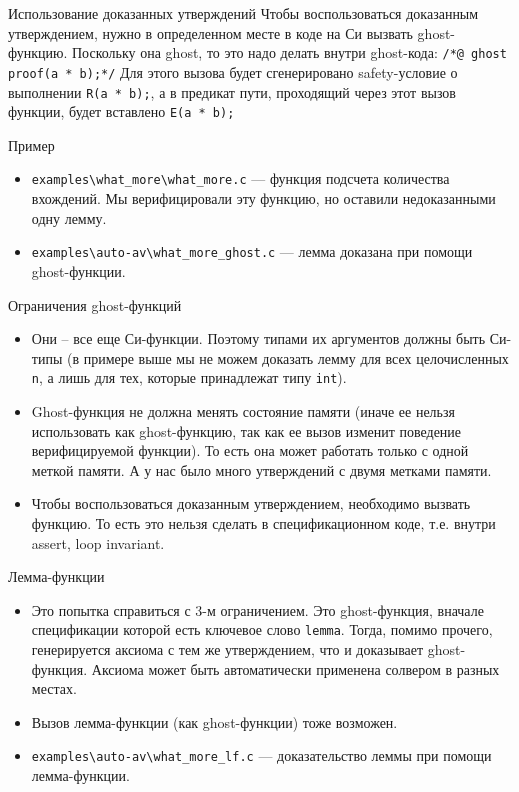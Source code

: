 \documentclass[hyperref={unicode=true}]{beamer}
\begin{document}
    \begin{frame}{Использование доказанных утверждений}
    Чтобы воспользоваться доказанным утверждением, нужно в определенном месте в коде на Си вызвать
    ghost-функцию. Поскольку она ghost, то это надо делать внутри ghost-кода:
    \texttt{/*@ ghost proof(a * b);*/} Для этого вызова будет сгенерировано safety-условие о выполнении
    \texttt{R(a * b);}, а в предикат пути, проходящий через этот вызов функции, будет вставлено
    \texttt{E(a * b);}
    \end{frame}

    \begin{frame}{Пример}
    \begin{itemize}
    \item \texttt{examples\textbackslash what\_more\textbackslash what\_more.c} --- функция подсчета
    количества вхождений. Мы верифицировали эту функцию, но оставили недоказанными одну лемму.
    \item \texttt{examples\textbackslash auto-av\textbackslash what\_more\_ghost.c} --- лемма доказана
    при помощи ghost-функции.
    \end{itemize}
    \end{frame}

    \begin{frame}{Ограничения ghost-функций}
    \begin{itemize}
    \item Они -- все еще Си-функции. Поэтому типами их аргументов должны быть Си-типы (в примере выше
            мы не можем доказать лемму для всех целочисленных \texttt{n}, а лишь для тех, которые
            принадлежат типу \texttt{int}).
    \item Ghost-функция не должна менять состояние памяти (иначе ее нельзя использовать как ghost-функцию,
            так как ее вызов изменит поведение верифицируемой функции). То есть она может работать только
    с одной меткой памяти. А у нас было много утверждений с двумя метками памяти.
    \item Чтобы воспользоваться доказанным утверждением, необходимо вызвать функцию. То есть это нельзя
    сделать в спецификационном коде, т.е. внутри assert, loop invariant.
    \end{itemize}
    \end{frame}

    \begin{frame}{Лемма-функции}
    \begin{itemize}
    \item Это попытка справиться с 3-м ограничением. Это ghost-функция, вначале спецификации которой есть
    ключевое слово \texttt{lemma}. Тогда, помимо прочего, генерируется аксиома с тем же утверждением, что и
    доказывает ghost-функция. Аксиома может быть автоматически применена солвером в разных местах.
    \item Вызов лемма-функции (как ghost-функции) тоже возможен.
    \item \texttt{examples\textbackslash auto-av\textbackslash what\_more\_lf.c} --- доказательство
    леммы при помощи лемма-функции.
    \end{itemize}
    \end{frame}
\end{document}
